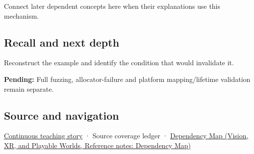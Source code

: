 \hypertarget{appendix-652d81568de9-used-by}{}

Connect later dependent concepts here when their explanations use this mechanism.

\subsection{Recall and next depth}\label{appendix-652d81568de9-recall-and-next-depth}

\hypertarget{appendix-652d81568de9-recall-and-next-depth}{}

Reconstruct the example and identify the condition that would invalidate it.

\textbf{Pending:} Full fuzzing, allocator-failure and platform mapping/lifetime validation remain separate.

\subsection{Source and navigation}\label{appendix-652d81568de9-source-and-navigation}

\hypertarget{appendix-652d81568de9-source-and-navigation}{}

\hyperref[01-foundations-i-ch002-bytes-become-a-durable-agreement]{Continuous teaching story} · {Source coverage ledger} · \href{../07-Vision-XR-and-Playable-Worlds/main.pdf\#nameddest=appendix-4ad47bdd269a}{Dependency Map (Vision, XR, and Playable Worlds, Reference notes: Dependency Map)}

